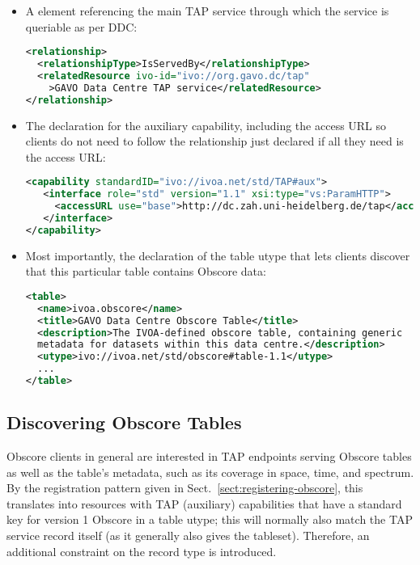 \documentclass[11pt,a4paper]{ivoa}
\begin{document}
\begin{itemize}
\item A  element referencing the main TAP service
through which the service is queriable as per DDC:
\begin{lstlisting}[language=XML,basicstyle=\footnotesize]
<relationship>
  <relationshipType>IsServedBy</relationshipType>
  <relatedResource ivo-id="ivo://org.gavo.dc/tap"
    >GAVO Data Centre TAP service</relatedResource>
</relationship>
\end{lstlisting}

\item The declaration for the auxiliary capability, including the access
URL so clients do not need to follow the relationship just declared if
all they need is the access URL:
\begin{lstlisting}[language=XML,basicstyle=\footnotesize]
<capability standardID="ivo://ivoa.net/std/TAP#aux">
   <interface role="std" version="1.1" xsi:type="vs:ParamHTTP">
     <accessURL use="base">http://dc.zah.uni-heidelberg.de/tap</accessURL>
   </interface>
</capability>
\end{lstlisting}

\item Most importantly, the declaration of the table utype that lets
clients discover that this particular table contains Obscore data:
\begin{lstlisting}[language=XML,basicstyle=\footnotesize]
<table>
  <name>ivoa.obscore</name>
  <title>GAVO Data Centre Obscore Table</title>
  <description>The IVOA-defined obscore table, containing generic
  metadata for datasets within this data centre.</description>
  <utype>ivo://ivoa.net/std/obscore#table-1.1</utype>
  ...
</table>
\end{lstlisting}
\end{itemize}

\subsection{Discovering Obscore Tables}
\label{sect:finding-obscore}

Obscore clients in general are interested in TAP endpoints serving Obscore
tables as well as the table's metadata, such as its coverage in space,
time, and spectrum.  By the  registration pattern given in
Sect.~\ref{sect:registering-obscore}, this translates into resources with TAP
(auxiliary) capabilities that have a standard key for version 1 Obscore
in a table utype; this will normally also match the TAP service record
itself (as it generally also gives the tableset). Therefore, an
additional constraint on the record type is introduced.
\end{document}

